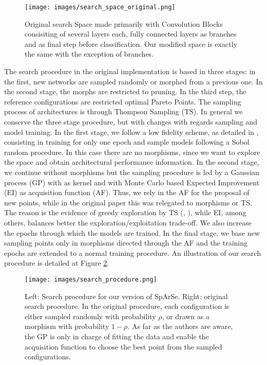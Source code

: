 \documentclass[10pt, a4paper, twocolumn]{article}
\begin{document}
\begin{figure}
	\centering
	\texttt{[image: images/search\_space\_original.png]}
	\caption{Original search Space made primarily with Convolution Blocks consisiting of several layers each, fully connected layers as branches and as final step before classification. Our modified space is exactly the same with the exception of branches.}
	\label{fig:searchspaceoriginal}
\end{figure}

The search procedure in the original implementation is based in three stages: in the first, new networks are sampled randomly or morphed from a previous one. In the second stage, the morphs are restricted to pruning. In the third step, the reference configurations are restricted optimal Pareto Points. The sampling process of architectures is through Thompson Sampling (TS). In general we conserve the three stage procedure, but with changes with regards sampling and model training. In the first stage, we follow a low fidelity scheme, as detailed in \cite{Elsken2019b}, consisting in training for only one epoch and sample models following a Sobol random procedure. In this case there are no morphisms, since we want to explore the space and obtain architectural performance information. In the second stage, we continue without morphisms but the sampling procedure is led by a Gaussian process (GP) with \cite{Swersky2014} as kernel and with Monte Carlo based Expected Improvement (EI) as acquisition function (AF). Thus, we rely in the AF for the proposal of new points, while in the original paper this was relegated to morphisms or TS. The reason is the evidence of greedy exploration by TS (\cite{Shahriari2016}, \cite{Shahriari2014}), while EI, among others, balances better the exploration/exploitation trade-off. We also increase  the epochs through which the models are trained. In the final stage, we base new sampling points only in morphisms directed through the AF and the training epochs are extended to a normal training procedure. An illustration of our search procedure is detailed at Figure \ref{fig:searchprocedure}.

\begin{figure}
	\centering
	\texttt{[image: images/search\_procedure.png]}
	\caption{Left: Search procedure for our version of SpArSe. Right: original search procedure. In the original procedure, each configuration is either sampled randomly with probability $\rho$, or drawn as a morphism with probability $1 - \rho$. As far as the authors are aware, the GP is only in charge of fitting the data and enable the acquisition function to choose the best point from the sampled configurations.}
	\label{fig:searchprocedure}
\end{figure}
\end{document}
